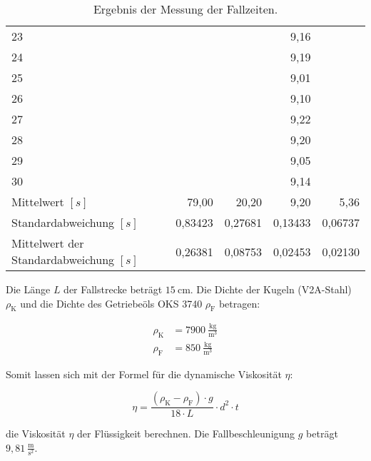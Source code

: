 \begin{table}[H]
\begin{tabular}{|l||r|r|r|r|}
                    23 &         &          & 9,16    &     \\
                    24 &         &          & 9,19    &     \\
                    25 &         &          & 9,01    &     \\
                    26 &         &          & 9,10    &     \\
                    27 &         &          & 9,22    &     \\
                    28 &         &          & 9,20    &     \\
                    29 &         &          & 9,05    &     \\
                    30 &         &          & 9,14    &     \\
                    \hline
                    Mittelwert $[s]$ & 79,00 & 20,20 & 9,20 & 5,36\\
                    Standardabweichung $[s]$ & 0,83423 & 0,27681 & 0,13433 & 0,06737\\
                    Mittelwert der Standardabweichung $[s]$ & 0,26381 & 0,08753 & 0,02453 & 0,02130\\
                    \hline
                \end{tabular}
                \caption{Ergebnis der Messung der Fallzeiten.}
                \label{tab:MesswerteFallzeiten}
            \end{table}

            Die Länge $L$ der Fallstrecke beträgt $15\ \mathrm{cm}$. Die Dichte der Kugeln (V2A-Stahl) $\rho_{\mathrm{K}}$ und die Dichte des Getriebeöls OKS 3740 $\rho_{\mathrm{F}}$ betragen:

            \begin{align}
                \rho_{\mathrm{K}} &= 7900\ \mathrm{\frac{kg}{m^{3}}}\\
                \rho_{\mathrm{F}} &= 850\ \mathrm{\frac{kg}{m^{3}}}
            \end{align}

            Somit lassen sich mit der Formel für die dynamische Viskosität $\eta$:

            \begin{equation}
                \eta = \frac{(\rho_{\mathrm{K}} - \rho_{\mathrm{F}}) \cdot g}{18 \cdot L} \cdot d^{2} \cdot t
            \end{equation}

            die Viskosität $\eta$ der Flüssigkeit berechnen. Die Fallbeschleunigung $g$ beträgt $9,81\ \mathrm{\frac{m}{s^{2}}}$.


